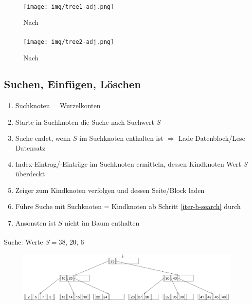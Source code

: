 \begin{frame}{\insertsection}
\framesubtitle{\insertsubsection}
\begin{figure}
	\texttt{[image: img/tree1-adj.png]}
	\caption{Nach \cite{EN10}}
\end{figure}
\end{frame}

\begin{frame}{\insertsection}
\framesubtitle{\insertsubsection}
\begin{figure}
\texttt{[image: img/tree2-adj.png]}
\caption{Nach \cite{EN10}}
\end{figure}
\end{frame}

\subsection{Suchen, Einf\"ugen, L\"oschen}

\begin{frame}{\insertsection}
\framesubtitle{\insertsubsection}
\begin{enumerate}
	\item Suchknoten = Wurzelkonten
	\item\label{iter-b-search} Starte in Suchknoten die Suche nach Suchwert $S$ 
	\item Suche endet, wenn $S$ im Suchknoten enthalten ist $\Rightarrow$ Lade Datenblock/Lese Datensatz 
	\item Index-Eintrag/-Eintr\"age im Suchknoten ermitteln, dessen Kindknoten Wert $S$ überdeckt 
	\item Zeiger zum Kindknoten verfolgen und dessen Seite/Block laden
	\item F\"uhre Suche mit Suchknoten = Kindknoten ab Schritt \ref{iter-b-search} durch
	\item Ansonsten ist $S$ nicht im Baum enthalten
\end{enumerate}
\end{frame}

\begin{frame}{\insertsection}
\framesubtitle{\insertsubsection}
\abs
Suche: Werte $S=38,\,20,\,6$
\begin{figure}
	\includegraphics[scale=0.43]{img/BTree-Search.png}
\end{figure}
\end{frame}


